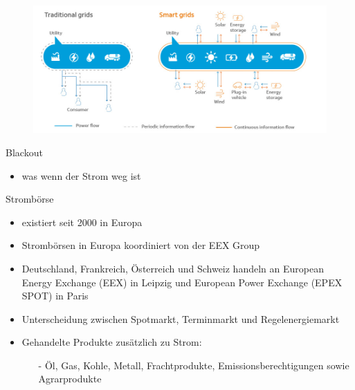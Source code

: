 \documentclass[aspectratio=1610, professionalfonts, 9pt]{beamer}
\begin{document}
\begin{frame}
\begin{figure}
  \includegraphics[width=1\textwidth]{images/smart-grid.jpg}
\end{figure}
\end{frame}

\begin{frame}{Blackout}
\begin{itemize}
  \item was wenn der Strom weg ist
\end{itemize}
\end{frame}




\begin{frame}{Strombörse}
\begin{itemize}
  \item existiert seit \num{2000} in Europa
  \item Strombörsen in Europa koordiniert von der EEX Group
  \item Deutschland, Frankreich, Österreich
  und Schweiz handeln an European Energy Exchange (EEX) in Leipzig
 und European Power Exchange (EPEX SPOT) in Paris
 \item Unterscheidung zwischen Spotmarkt, Terminmarkt und Regelenergiemarkt
\item Gehandelte Produkte zusätzlich zu Strom:
    \begin{itemize}
      \item[-]Öl, Gas, Kohle, Metall, Frachtprodukte,
       Emissionsberechtigungen sowie Agrarprodukte
    \end{itemize}
\end{itemize}
\end{frame}
\end{document}
